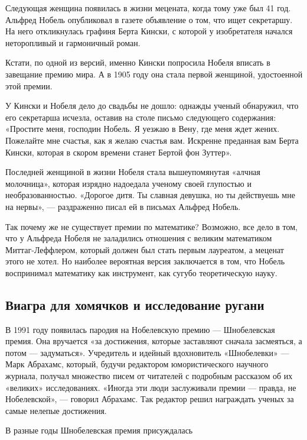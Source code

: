 Следующая женщина появилась в жизни мецената, когда тому уже был 41 год. Альфред Нобель опубликовал в газете объявление о том, что ищет секретаршу. На него откликнулась графиня Берта Кински, с которой у изобретателя начался неторопливый и гармоничный роман.

\begin{fancyquotes}
    Кстати, по одной из версий, именно Кински попросила Нобеля вписать в завещание премию мира. А в 1905 году она стала первой женщиной, удостоенной этой премии.
\end{fancyquotes}

У Кински и Нобеля дело до свадьбы не дошло: однажды ученый обнаружил, что его секретарша исчезла, оставив на столе письмо следующего содержания: «Простите меня, господин Нобель. Я уезжаю в Вену, где меня ждет жених. Пожелайте мне счастья, как я желаю счастья вам. Искренне преданная вам Берта Кински, которая в скором времени станет Бертой фон Зуттер».

Последней женщиной в жизни Нобеля стала вышеупомянутая «алчная молочница», которая изрядно надоедала ученому своей глупостью и необразованностью. «Дорогое дитя. Ты славная девушка, но ты действуешь мне на нервы», --- раздраженно писал ей в письмах Альфред Нобель.

Так почему же не существует премии по математике? Возможно, все дело в том, что у Альфреда Нобеля не заладились отношения с великим математиком Миттаг-Леффлером, который должен был стать первым лауреатом, а меценат этого не хотел. Но наиболее вероятная версия заключается в том, что Нобель воспринимал математику как инструмент, как сугубо теоретическую науку.

\subsection{Виагра для хомячков и исследование ругани}

В 1991 году появилась пародия на Нобелевскую премию --- Шнобелевская премия. Она вручается «за достижения, которые заставляют сначала засмеяться, а потом --- задуматься». Учредитель и идейный вдохновитель «Шнобелевки» --- Марк Абрахамс, который, будучи редактором юмористического научного журнала, получал множество писем от читателей с подробным рассказом об их «великих» исследованиях. «Иногда эти люди заслуживали премии --- правда, не Нобелевской», --- говорил Абрахамс. Так редактор решил награждать ученых за самые нелепые достижения.

В разные годы Шнобелевская премия присуждалась

